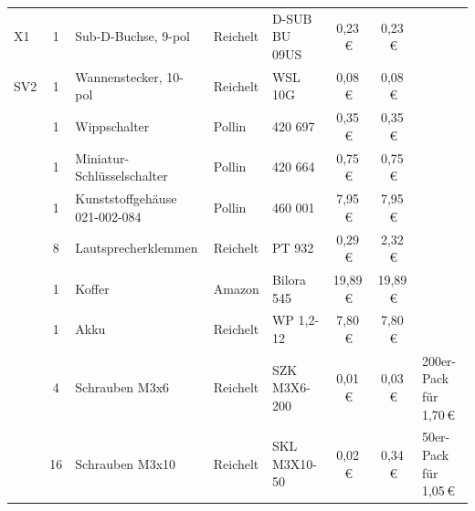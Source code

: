 \documentclass[paper=a4, parskip, numbers=noenddot, toc=listof, headsepline]{scrbook}
\begin{document}
{\begin{longtabu}{p{1.2cm}cXllSSp{2.35cm}}
					X1                                 & 1    & Sub-D-Buchse, 9-pol                       & Reichelt   & D-SUB BU 09US                                                        & 0,23\,€  & 0,23\,€  &                        \\
					SV2                                & 1    & Wannenstecker, 10-pol                     & Reichelt   & WSL 10G                                                              & 0,08\,€  & 0,08\,€  &                        \\
					                                   & 1    & Wippschalter                              & Pollin     & 420 697                                                              & 0,35\,€  & 0,35\,€  &                        \\
					                                   & 1    & Miniatur-Schlüsselschalter                & Pollin     & 420 664                                                              & 0,75\,€  & 0,75\,€  &                        \\
					                                   & 1    & Kunststoffgehäuse 021-002-084             & Pollin     & 460 001                                                              & 7,95\,€  & 7,95\,€  &                        \\
					                                   & 8    & Laut\-sprech\-er\-klem\-men               & Reichelt   & PT 932                                                               & 0,29\,€  & 2,32\,€  &                        \\
					                                   & 1    & Koffer                                    & Amazon     & Bilora 545                                                           & 19,89\,€ & 19,89\,€ &                        \\
					                                   & 1    & Akku                                      & Reichelt   & WP 1,2-12                                                            & 7,80\,€  & 7,80\,€  &                        \\
					                                   & 4    & Schrauben M3x6                            & Reichelt   & SZK M3X6-200                                                         & 0,01\,€  & 0,03\,€  & 200er-Pack für 1,70\,€ \\
					                                   & 16   & Schrauben M3x10                           & Reichelt   & SKL M3X10-50                                                         & 0,02\,€  & 0,34\,€  & 50er-Pack für 1,05\,€  \\

\end{longtabu}}
\end{document}
